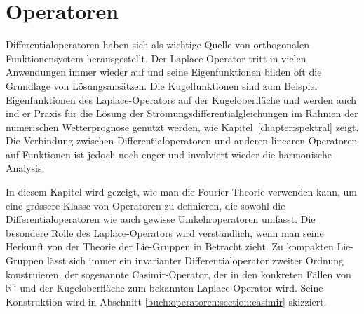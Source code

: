%
%
%
\chapter{Operatoren
\label{buch:chapter:operatoren}}
Differentialoperatoren haben sich als wichtige Quelle von orthogonalen
Funktionensystem herausgestellt.
Der Laplace-Operator tritt in vielen Anwendungen immer wieder auf
und seine Eigenfunktionen bilden oft die Grundlage von Lösungsansätzen.
Die Kugelfunktionen sind zum Beispiel Eigenfunktionen des Laplace-Operators
auf der Kugeloberfläche und werden auch ind er Praxis für die Lösung der
Strömungsdifferentialgleichungen im Rahmen der numerischen Wetterprognose 
genutzt werden, wie Kapitel~\ref{chapter:spektral} zeigt.
Die Verbindung zwischen Differentialoperatoren und anderen linearen
Operatoren auf Funktionen ist jedoch noch enger und involviert wieder
die harmonische Analysis.

In diesem Kapitel wird gezeigt, wie man die Fourier-Theorie verwenden
kann, um eine grössere Klasse von Operatoren zu definieren, die sowohl
die Differentialoperatoren wie auch gewisse Umkehroperatoren umfasst.
Die besondere Rolle des Laplace-Operators wird verständlich, wenn man
seine Herkunft von der Theorie der Lie-Gruppen in Betracht zieht.
Zu kompakten Lie-Gruppen lässt sich immer ein invarianter
Differentialoperator zweiter Ordnung konstruieren, der sogenannte
Casimir-Operator, der in den konkreten Fällen von $\mathbb{R}^n$
und der Kugeloberfläche zum bekannten Laplace-Operator wird.
Seine Konstruktion wird in Abschnitt \ref{buch:operatoren:section:casimir}
skizziert.




